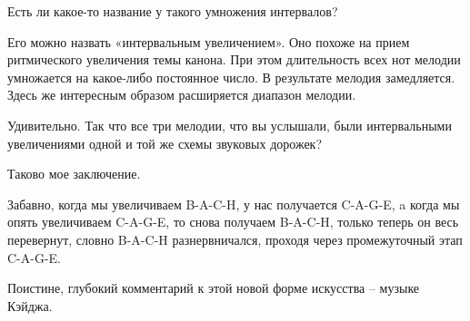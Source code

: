 \documentclass[../main.tex]{subfiles}
\begin{document}
\begin{Dialogue}
 Есть ли какое-то название у такого умножения интервалов?

 Его можно назвать «интервальным увеличением». Оно похоже на прием ритмического увеличения темы канона. При этом длительность всех нот мелодии умножается на какое-либо постоянное число. В результате мелодия замедляется. Здесь же интересным образом расширяется диапазон мелодии.

 Удивительно. Так что все три мелодии, что вы услышали, были интервальными увеличениями одной и той же схемы звуковых дорожек?

 Таково мое заключение.

 Забавно, когда мы увеличиваем \mbox{B-A-C-H}, у нас получается \mbox{C-A-G-E}, a когда мы опять увеличиваем \mbox{C-A-G-E}, то снова получаем \mbox{B-A-C-H}, только теперь он весь перевернут, словно \mbox{B-A-C-H} разнервничался, проходя через промежуточный этап \mbox{C-A-G-E}.

 Поистине, глубокий комментарий к этой новой форме искусства \--- музыке Кэйджа.

\end{Dialogue}
\end{document}

